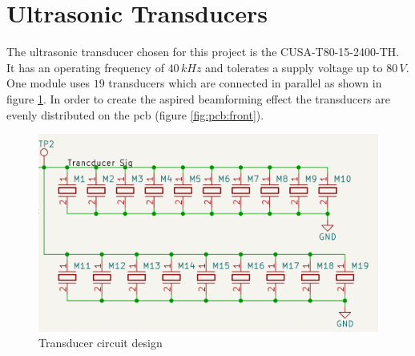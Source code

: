 \section{Ultrasonic Transducers}

The ultrasonic transducer chosen for this project is the CUSA-T80-15-2400-TH. It has an operating frequency of $40\,kHz$ and tolerates a supply voltage up to $80\,V$.\cite{cui_devices_cusa-t80-15-2400-th_2020}\newpage
\noindent One module uses $19$ transducers which are connected in parallel as shown in figure \ref{fig:pcb:transducer_circuit}. In order to create the aspired beamforming effect the transducers are evenly distributed on the pcb (figure \ref{fig:pcb:front}).
%
\begin{figure}
  \centering
  \includegraphics[height=\mediumheight]{src/assets/pictures/circuit/transducer_circuit.png}
  \caption{Transducer circuit design}\label{fig:pcb:transducer_circuit}
\end{figure}